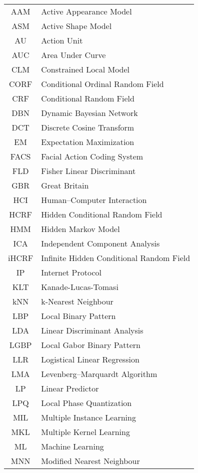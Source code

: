 \documentclass[11pt]{book}  %
\begin{document}
\begin{center}
\begin{tabular*}{0.65\textwidth}{  c | l  }

{AAM}&Active Appearance Model\\
{ASM}&Active Shape Model\\
{AU}&Action Unit\\
{AUC}&Area Under Curve\\
{CLM}&Constrained Local Model\\
{CORF}&Conditional Ordinal Random Field\\
{CRF}&Conditional Random Field\\
{DBN}&Dynamic Bayesian Network\\
{DCT}&Discrete Cosine Transform\\
{EM}&Expectation Maximization\\
{FACS}&Facial Action Coding System\\
{FLD}&Fisher Linear Discriminant\\
{GBR}&Great Britain\\
{HCI}&Human--Computer Interaction\\
{HCRF}&Hidden Conditional Random Field\\
{HMM}&Hidden Markov Model\\
{ICA}&Independent Component Analysis\\
{iHCRF}&Infinite Hidden Conditional Random Field\\
{IP}&Internet Protocol\\
{KLT}&Kanade-Lucas-Tomasi\\
{kNN}&k-Nearest Neighbour\\
{LBP}&Local Binary Pattern\\
{LDA}&Linear Discriminant Analysis\\
{LGBP}&Local Gabor Binary Pattern\\
{LLR}&Logistical Linear Regression\\
{LMA}&Levenberg--Marquardt Algorithm\\
{LP}&Linear Predictor\\
{LPQ}&Local Phase Quantization\\
{MIL}&Multiple Instance Learning\\
{MKL}&Multiple Kernel Learning\\
{ML}&Machine Learning\\
{MNN}&Modified Nearest Neighbour\\

\end{tabular*}
\end{center}
\end{document}
